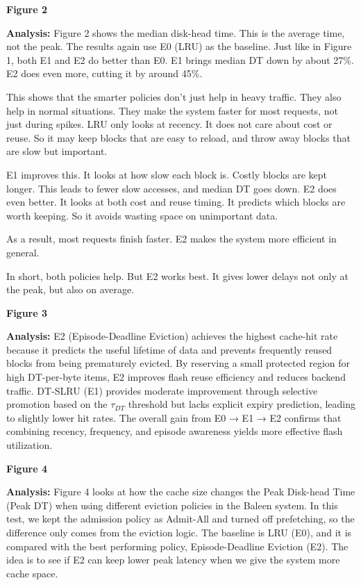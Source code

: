 \textbf{Figure 2}

\textbf{Analysis:}
Figure 2 shows the median disk-head time. This is the average time, not the peak. The results again use E0 (LRU) as the baseline. Just like in Figure 1, both E1 and E2 do better than E0. E1 brings median DT down by about 27\%. E2 does even more, cutting it by around 45\%.

This shows that the smarter policies don’t just help in heavy traffic. They also help in normal situations. They make the system faster for most requests, not just during spikes. LRU only looks at recency. It does not care about cost or reuse. So it may keep blocks that are easy to reload, and throw away blocks that are slow but important.

E1 improves this. It looks at how slow each block is. Costly blocks are kept longer. This leads to fewer slow accesses, and median DT goes down. E2 does even better. It looks at both cost and reuse timing. It predicts which blocks are worth keeping. So it avoids wasting space on unimportant data.

As a result, most requests finish faster. E2 makes the system more efficient in general.

In short, both policies help. But E2 works best. It gives lower delays not only at the peak, but also on average.



\textbf{Figure 3}

\textbf{Analysis:}
E2 (Episode-Deadline Eviction) achieves the highest cache-hit rate because it predicts the useful lifetime of data and prevents frequently reused blocks from being prematurely evicted. 
By reserving a small protected region for high DT-per-byte items, E2 improves flash reuse efficiency and reduces backend traffic. 
DT-SLRU (E1) provides moderate improvement through selective promotion based on the $\tau_{DT}$ threshold but lacks explicit expiry prediction, leading to slightly lower hit rates. 
The overall gain from E0 → E1 → E2 confirms that combining recency, frequency, and episode awareness yields more effective flash utilization.


\textbf{Figure 4}

\textbf{Analysis:}
Figure 4 looks at how the cache size changes the Peak Disk-head Time (Peak DT) when using different eviction policies in the Baleen system. In this test, we kept the admission policy as Admit-All and turned off prefetching, so the difference only comes from the eviction logic. The baseline is LRU (E0), and it is compared with the best performing policy, Episode-Deadline Eviction (E2). The idea is to see if E2 can keep lower peak latency when we give the system more cache space.

